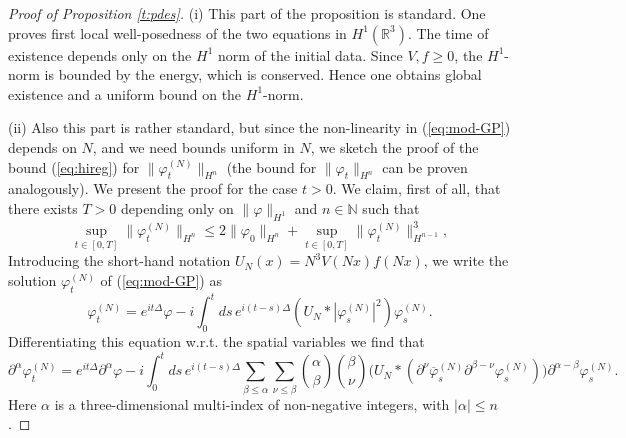 \documentclass[11pt,a4paper]{article}
\newcommand{\done}{}
\newcommand{\bR}{{\mathbb R}}
\newcommand{\bN}{{\mathbb N}}
\newcommand{\cE}{{\cal E}}
\newcommand{\ph}{\varphi_t^{(N)}}	%
\begin{document}
\begin{proof}[Proof of Proposition \ref{t:pdes}] 
(i) This part of the proposition is standard. One proves first local well-posedness of the two equations in $H^1 (\bR^3)$. The time of existence depends only on the $H^1$ norm of the initial data. Since $V,f \geq 0$, the $H^1$-norm is bounded by the energy, which is conserved.  
Hence one obtains global existence and a uniform bound on the $H^1$-norm. 

(ii) Also this part is rather standard, but since the non-linearity in (\ref{eq:mod-GP}) depends on $N$, and we need bounds uniform in $N$, we sketch the proof of the bound (\ref{eq:hireg}) for $\| \varphi_t^{(N)} \|_{H^n}$ (the bound for $\| \varphi_t \|_{H^n}$ can be proven analogously). We present the proof for the case $t >0$. We claim, first of all, that there exists $T>0$ depending only on $\| \varphi \|_{H^1}$ and $n \in \bN$ such that
  \begin{equation}\label{eq:preregularity}
    \sup_{t \in [0,T]} \| \varphi_t^{(N)} \|_{H^n} \le 2 \| \varphi_0 \|_{H^n} +
     \sup_{t \in [0,T]} \| \varphi_t^{(N)} \|_{H^{n-1}}^3,\done
 \end{equation}
 Introducing the short-hand notation $U_N (x)= N^3 V(Nx)f(Nx)$, we write the solution 
$\varphi_t^{(N)}$ of (\ref{eq:mod-GP}) as
\[
\varphi^{(N)}_t = e^{it\Delta} \varphi - i \int_0^t ds \, e^{i(t-s)\Delta} (U_N *
|\varphi^{(N)}_s|^2) \varphi^{(N)}_s.\]
Differentiating this equation w.r.t. the spatial variables we find that
\[
    \partial^\alpha \varphi^{(N)}_t = e^{it \Delta} \partial^\alpha \varphi - i
    \int_0^t ds \, e^{i(t-s) \Delta} \sum_{\beta \le \alpha} \sum_{\nu \le
    \beta} \binom{\alpha}{\beta} \binom{\beta}{\nu} \big( U_N * (\partial^\nu
    \overline{\varphi}^{(N)}_s \partial^{\beta - \nu} \varphi^{(N)}_s) \big)
    \partial^{\alpha - \beta} \varphi^{(N)}_s. \]
Here $\alpha$ is a three-dimensional multi-index of non-negative integers, with $|\alpha| \leq n$.
  

\end{proof}
\end{document}
